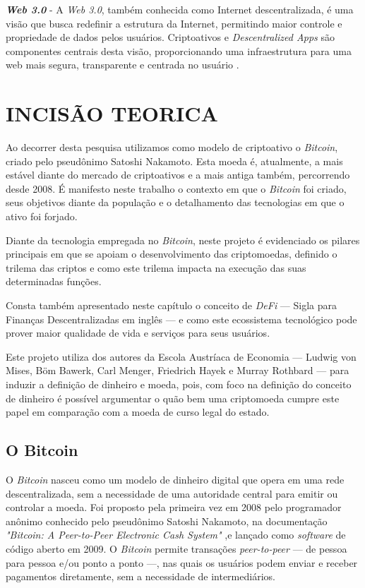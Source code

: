 \documentclass[article,12pt,oneside,a4paper,english,brazil]{unifil}
\begin{document}
\begin{Spacing}{1.5}
\textbf{\textit{Web 3.0}} - A \textit{Web 3.0}, também conhecida como Internet descentralizada, é uma visão que busca redefinir a estrutura da Internet, permitindo maior controle e propriedade de dados pelos usuários. Criptoativos e \textit{Descentralized Apps} são componentes centrais desta visão, proporcionando uma infraestrutura para uma web mais segura, transparente e centrada no usuário \cite{zhang2019secure}.

\section*{INCISÃO TEORICA}

Ao decorrer desta pesquisa utilizamos como modelo de criptoativo o \textit{Bitcoin}, criado pelo pseudônimo Satoshi Nakamoto. Esta moeda é, atualmente, a mais estável diante do mercado de criptoativos e a mais antiga também, percorrendo desde 2008. É manifesto neste trabalho o contexto em que o \textit{Bitcoin} foi criado, seus objetivos diante da população e o detalhamento das tecnologias em que o ativo foi forjado.

Diante da tecnologia empregada no \textit{Bitcoin}, neste projeto é evidenciado os pilares principais em que se apoiam o desenvolvimento das criptomoedas, definido o trilema das criptos e como este trilema impacta na execução das suas determinadas funções.

Consta também apresentado neste capítulo o conceito de \textit{DeFi} — Sigla para Finanças Descentralizadas em inglês — e como este ecossistema tecnológico pode prover maior qualidade de vida e serviços para seus usuários.

Este projeto utiliza dos autores da Escola Austríaca de Economia — Ludwig von Mises, Böm Bawerk, Carl Menger, Friedrich Hayek e Murray Rothbard — para induzir a definição de dinheiro e moeda, pois, com foco na definição do conceito de dinheiro é possível argumentar o quão bem uma criptomoeda cumpre este papel em comparação com a moeda de curso legal do estado.

\subsection*{O Bitcoin} \label{sec:bitcoin}

O \textit{Bitcoin} nasceu como um modelo de dinheiro digital que opera em uma rede descentralizada, sem a necessidade de uma autoridade central para emitir ou controlar a moeda. Foi proposto pela primeira vez em 2008 pelo programador anônimo conhecido pelo pseudônimo Satoshi Nakamoto, na documentação \textit{"Bitcoin: A Peer-to-Peer Electronic Cash System"} \cite{Nakamoto2009} ,e lançado como \textit{software} de código aberto em 2009. O \textit{Bitcoin} permite transações \textit{peer-to-peer} — de pessoa para pessoa e/ou ponto a ponto —, nas quais os usuários podem enviar e receber pagamentos diretamente, sem a necessidade de intermediários.


\end{Spacing}
\end{document}

